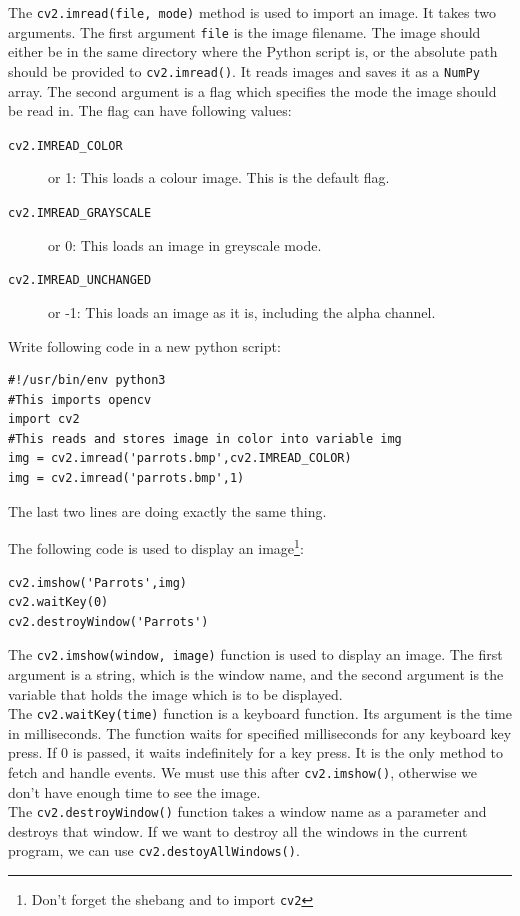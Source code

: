 \documentclass{labo}
\newcommand{\numpy}{\texttt{NumPy} }
\begin{document}
The \texttt{cv2.imread(file, mode)} method is used to import an image. It takes two arguments. The first argument \texttt{file} is the image filename. The image should either be in the same directory where the Python script is, or the absolute path should be provided to \texttt{cv2.imread()}. It reads images and saves it as a \numpy array.
The second argument is a flag which specifies the mode the image should be read in. The flag can have following values:
\begin{description}
\item[\texttt{cv2.IMREAD\_COLOR}] or 1: This loads a colour image. This is the default flag.
\item[\texttt{cv2.IMREAD\_GRAYSCALE}] or 0: This loads an image in greyscale mode.
\item[\texttt{cv2.IMREAD\_UNCHANGED}] or -1: This loads an image as it is, including the alpha channel.
\end{description}


Write following code in a new python script:
\begin{verbatim}
#!/usr/bin/env python3
#This imports opencv
import cv2
#This reads and stores image in color into variable img
img = cv2.imread('parrots.bmp',cv2.IMREAD_COLOR)
img = cv2.imread('parrots.bmp',1)
\end{verbatim}
The last two lines are doing exactly the same thing.

The following code is used to display an image\footnote{Don't forget the shebang and to import \texttt{cv2}}:
\begin{verbatim}
cv2.imshow('Parrots',img)
cv2.waitKey(0)
cv2.destroyWindow('Parrots')
\end{verbatim}

The \texttt{cv2.imshow(window, image)} function is used to display an image. The first argument is a string, which is the window name, and the second argument is the variable that holds the image which is to be displayed.\\

The \texttt{cv2.waitKey(time)} function is a keyboard function. Its argument is the time in milliseconds.
The function waits for specified milliseconds for any keyboard key press. If 0 is passed, it waits indefinitely for a key press. It is the only method to fetch and handle events. We must use this after \texttt{cv2.imshow()}, otherwise we don't have enough time to see the image.\\

The \texttt{cv2.destroyWindow()} function takes a window name as a parameter and destroys that window. If we want to destroy all the windows in the current program, we can use \texttt{cv2.destoyAllWindows()}.\\
\end{document}
